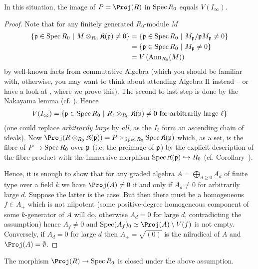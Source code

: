 \documentclass[a4paper,parskip=half,numbers=enddot, DIV=12]{scrreprt}
\begin{document}
\begin{prop}
    In this situation, the image of $P=\Proj(R)$ in $\operatorname{Spec} R_0$ equals $V(I_\infty)$.
\end{prop}
\begin{proof}
    Note that for any finitely generated $R_0$-module $M$ 
    \begin{align*}
        \left\{\mathfrak{p}\in \operatorname{Spec} R_0\ \middle|\  M\otimes_{R_0}\mathfrak{K}(\mathfrak{p})\neq 0\right\} &= \left\{\mathfrak{p}\in \operatorname{Spec} R_0 \ \middle|\  M_{\mathfrak{p}}/\mathfrak{p} M_{\mathfrak{p}} \neq 0\right\}\\
        &= \left\{\mathfrak{p}\in \operatorname{Spec} R_0\ \middle|\  M_{\mathfrak{p}}\neq 0\right\}\\
        &= V\left(\operatorname{Ann}_{R_0}(M)\right)
    \end{align*}
    by well-known facts from commutative Algebra (which you should be familiar with, otherwise, you may want to think about attending Algebra $\mathrm{II}$ instead -- or have a look at \cite[Lemma~3.4.1]{alg2}, where we prove this). The second to last step is done by the Nakayama lemma (cf. \cite[Proposition~1.2.3]{alg2}). Hence 
    \begin{align*}
        V(I_\infty) = \left\{\mathfrak{p}\in \operatorname{Spec} R_0\ \middle|\  R_\ell\otimes_{R_0} \mathfrak{K}(\mathfrak{p})\neq 0 \text{ for arbitrarily large } \ell\right\}
    \end{align*}
    (one could replace \emph{arbitrarily large} by \emph{all}, as the $I_\ell$ form an ascending chain of ideals). Now $\Proj(R\otimes_{R_0} \KK(\pp)) = P\times_{\Spec R_0} \Spec\KK(\pp)$ which, as a set, is the fibre of $P\morphism \Spec R_0$ over $\mathfrak{p}$ (i.e. the preimage of $\mathfrak{p}$) by the explicit description of the fibre product with the immersive morphism $\Spec \KK(\pp) \monomorphism R_0$ (cf. Corollary~). 
    
    Hence, it is enough to show that for any graded algebra $A=\bigoplus_{d\geq 0}A_d$ of finite type over a field $k$ we have $\Proj(A)\neq 0$ if and only if $A_d \neq 0$ for arbitrarily large $d$. Suppose the latter is the case. But then there must be a homogeneous $f\in A_+$ which is not nilpotent (some positive-degree homogeneous component of some $k$-generator of $A$ will do, otherwise $A_d=0$ for large $d$, contradicting the assumption) hence $A_f \neq 0$ and $\Spec(A_f)_0 \simeq \Proj(A)\setminus V(f)$ is not empty. Conversely, if $A_d = 0$ for large $d$ then $A_+ = \sqrt{(0)}$ is the nilradical of $A$ and $\Proj(A) = \emptyset$.
\end{proof}
\begin{cor}
    The morphism $\Proj(R) \morphism \Spec R_0$ is closed under the above assumption.
\end{cor}
\end{document}
